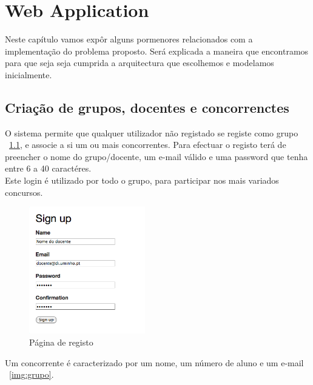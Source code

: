 \chapter{Web Application} \label{chap webApp}
\minitoc
Neste capítulo vamos expôr alguns pormenores relacionados com a implementação do problema proposto.
Será explicada a maneira que encontramos para que seja seja cumprida a arquitectura que escolhemos e modelamos inicialmente.

\section{Criação de grupos, docentes e concorrenctes}\label{sec gdc}
O sistema permite que qualquer utilizador não registado se registe como grupo ~\ref{img:signup}, e associe a si um ou mais concorrentes. Para efectuar o registo terá de preencher o nome do grupo/docente, um e-mail válido e uma password que tenha entre 6 a 40 caractéres.\\
Este login é utilizado por todo o grupo, para participar nos mais variados concursos.\\

\begin{figure}[H]
\begin{center}
\includegraphics[width=0.45\textwidth]{Images/signup}
\caption{Página de registo}\label{img:signup}
\end{center}
\end{figure} 

Um concorrente é caracterizado por um nome, um número de aluno e um e-mail ~\ref{img:grupo}.

